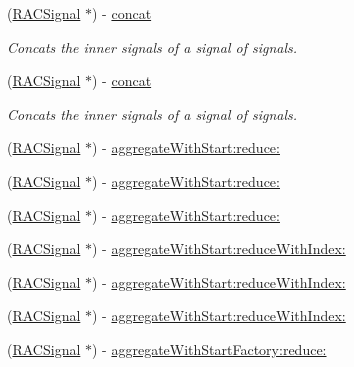 \begin{DoxyCompactItemize}
(\mbox{\hyperlink{interface_r_a_c_signal}{R\+A\+C\+Signal}} $\ast$) -\/ \mbox{\hyperlink{interface_r_a_c_signal_a68bff1ad76f3dddda45dcf3dc98a1ae2}{concat}}
\begin{DoxyCompactList}\small\item\em Concats the inner signals of a signal of signals. \end{DoxyCompactList}\item 
\mbox{\label{interface_r_a_c_signal_a68bff1ad76f3dddda45dcf3dc98a1ae2}} 
(\mbox{\hyperlink{interface_r_a_c_signal}{R\+A\+C\+Signal}} $\ast$) -\/ \mbox{\hyperlink{interface_r_a_c_signal_a68bff1ad76f3dddda45dcf3dc98a1ae2}{concat}}
\begin{DoxyCompactList}\small\item\em Concats the inner signals of a signal of signals. \end{DoxyCompactList}\item 
(\mbox{\hyperlink{interface_r_a_c_signal}{R\+A\+C\+Signal}} $\ast$) -\/ \mbox{\hyperlink{interface_r_a_c_signal_a4b872b6c2322aa37f98282043e768582}{aggregate\+With\+Start\+:reduce\+:}}
\item 
(\mbox{\hyperlink{interface_r_a_c_signal}{R\+A\+C\+Signal}} $\ast$) -\/ \mbox{\hyperlink{interface_r_a_c_signal_a4b872b6c2322aa37f98282043e768582}{aggregate\+With\+Start\+:reduce\+:}}
\item 
(\mbox{\hyperlink{interface_r_a_c_signal}{R\+A\+C\+Signal}} $\ast$) -\/ \mbox{\hyperlink{interface_r_a_c_signal_a4b872b6c2322aa37f98282043e768582}{aggregate\+With\+Start\+:reduce\+:}}
\item 
(\mbox{\hyperlink{interface_r_a_c_signal}{R\+A\+C\+Signal}} $\ast$) -\/ \mbox{\hyperlink{interface_r_a_c_signal_a83c6fc367091505aa6721f1c6a58d65d}{aggregate\+With\+Start\+:reduce\+With\+Index\+:}}
\item 
(\mbox{\hyperlink{interface_r_a_c_signal}{R\+A\+C\+Signal}} $\ast$) -\/ \mbox{\hyperlink{interface_r_a_c_signal_a83c6fc367091505aa6721f1c6a58d65d}{aggregate\+With\+Start\+:reduce\+With\+Index\+:}}
\item 
(\mbox{\hyperlink{interface_r_a_c_signal}{R\+A\+C\+Signal}} $\ast$) -\/ \mbox{\hyperlink{interface_r_a_c_signal_a83c6fc367091505aa6721f1c6a58d65d}{aggregate\+With\+Start\+:reduce\+With\+Index\+:}}
\item 
(\mbox{\hyperlink{interface_r_a_c_signal}{R\+A\+C\+Signal}} $\ast$) -\/ \mbox{\hyperlink{interface_r_a_c_signal_a51c08c7a357f83c96c468a6aa13d4d87}{aggregate\+With\+Start\+Factory\+:reduce\+:}}

\end{DoxyCompactItemize}
